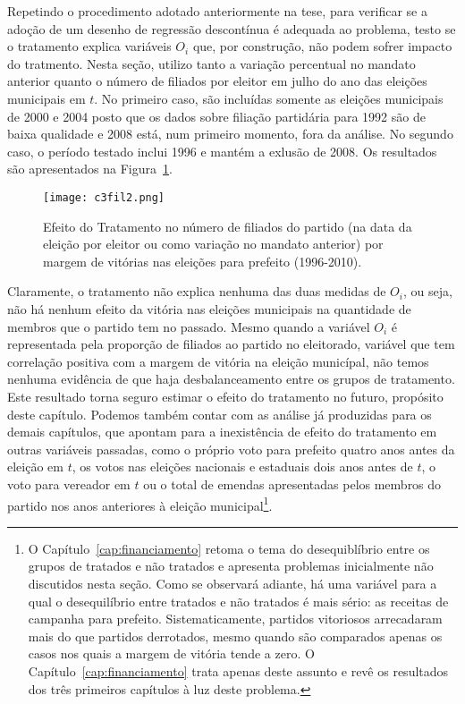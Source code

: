 Repetindo o procedimento adotado anteriormente na tese, para verificar se a adoção de um desenho de regressão descontínua é adequada ao problema, testo se o tratamento explica variáveis $O_{i}$ que, por construção, não podem sofrer impacto do tratmento. Nesta seção, utilizo tanto a variação percentual no mandato anterior quanto o número de filiados por eleitor em julho do ano das eleições municipais em $t$. No primeiro caso, são incluídas somente as eleições municipais de 2000 e 2004 posto que os dados sobre filiação partidária para 1992 são de baixa qualidade e 2008 está, num primeiro momento, fora da análise. No segundo caso, o período testado inclui 1996 e mantém a exlusão de 2008. Os resultados são apresentados na Figura~\ref{fig:c3fil2}.

\begin{figure}[htp]
	\centering
	\texttt{[image: c3fil2.png]}
	\caption{Efeito do Tratamento no número de filiados do partido (na data da eleição por eleitor ou como variação no mandato anterior) por margem de vitórias nas eleições para prefeito (1996-2010).}
	\label{fig:c3fil2}
\end{figure}

Claramente, o tratamento não explica nenhuma das duas medidas de $O_{i}$, ou seja, não há nenhum efeito da vitória nas eleições municipais na quantidade de membros que o partido tem no passado. Mesmo quando a variável $O_{i}$ é representada pela proporção de filiados ao partido no eleitorado, variável que tem correlação positiva com a margem de vitória na eleição municípal, não temos nenhuma evidência de que haja desbalanceamento entre os grupos de tratamento. Este resultado torna seguro estimar o efeito do tratamento no futuro, propósito deste capítulo. Podemos também contar com as análise já produzidas para os demais capítulos, que apontam para a inexistência de efeito do tratamento em outras variáveis passadas, como o próprio voto para prefeito quatro anos antes da eleição em $t$, os votos nas eleições nacionais e estaduais dois anos antes de $t$, o voto para vereador em $t$ ou o total de emendas apresentadas pelos membros do partido nos anos anteriores à eleição municipal\footnote{O Capítulo~\ref{cap:financiamento} retoma o tema do desequiblíbrio entre os grupos de tratados e não tratados e apresenta problemas inicialmente não discutidos nesta seção. Como se observará adiante, há uma variável para a qual o desequilíbrio entre tratados e não tratados é mais sério: as receitas de campanha para prefeito. Sistematicamente, partidos vitoriosos arrecadaram mais do que partidos derrotados, mesmo quando são comparados apenas os casos nos quais a margem de vitória tende a zero. O Capítulo~\ref{cap:financiamento} trata apenas deste assunto e revê os resultados dos três primeiros capítulos à luz deste problema.}.

